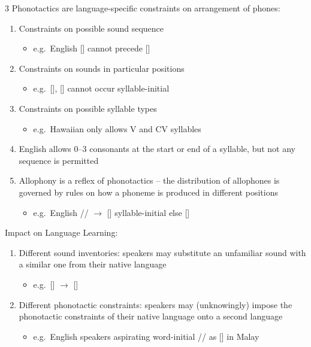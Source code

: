 \documentclass[12pt, a4paper]{article}
\begin{document}
\begin{multicols*}{3}
Phonotactics are language-specific constraints on arrangement of phones:
\begin{enumerate}[\roman*.]
  \item Constraints on possible sound sequence
    \begin{itemize}[leftmargin=*]\vspace{3pt}
      \item e.g.\ English [] cannot precede []
    \end{itemize}
  \item Constraints on sounds in particular positions
    \begin{itemize}[leftmargin=*]\vspace{3pt}
      \item e.g.\ [], [] cannot occur syllable-initial
    \end{itemize}
  \item Constraints on possible syllable types
    \begin{itemize}[leftmargin=*]\vspace{3pt}
      \item e.g.\  Hawaiian only allows V and CV syllables
    \end{itemize}
  \item English allows 0--3 consonants at the start or end of a syllable, but not any sequence is permitted
  \item Allophony is a reflex of phonotactics -- the distribution of allophones is governed by rules on how a phoneme is produced in different positions
    \begin{itemize}[leftmargin=*]\vspace{3pt}
      \item e.g.\ English // $\rightarrow$ [] syllable-initial else []
    \end{itemize}
\end{enumerate}

Impact on Language Learning:
\begin{enumerate}[\roman*.]
  \item Different sound inventories: speakers may substitute an unfamiliar sound with a similar one from their native language
    \begin{itemize}[leftmargin=*]\vspace{3pt}
      \item e.g.\ [\textipa{\textltailn}] $\to$ []
    \end{itemize}
  \item Different phonotactic constraints: speakers may (unknowingly) impose the phonotactic constraints of their native language onto a second language
    \begin{itemize}[leftmargin=*]\vspace{3pt}
      \item e.g.\ English speakers aspirating word-initial // as [] in Malay
    \end{itemize}
\end{enumerate}


\end{multicols*}
\end{document}
